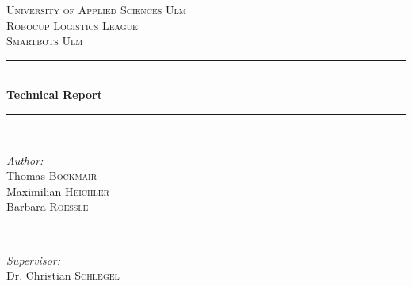 \documentclass[12pt]{report}
\begin{document}
\begin{titlepage}

\newcommand{\HRule}{\rule{\linewidth}{0.5mm}} %

\center %
 

\textsc{\LARGE University of Applied Sciences Ulm}\\[1.5cm] %
\textsc{\Large Robocup Logistics League}\\[0.5cm] %
\textsc{\large Smartbots Ulm}\\[0.5cm] %


\HRule \\[0.4cm]
{ \huge \bfseries Technical Report}\\[0.4cm] %
\HRule \\[1.5cm]
 

\begin{minipage}{0.4\textwidth}
\begin{flushleft} \large
\emph{Author:}\\
Thomas \textsc{Bockmair} \\%
Maximilian \textsc{Heichler} \\%
Barbara \textsc{Roessle} \\%
\end{flushleft}
\end{minipage}
~
\begin{minipage}{0.4\textwidth}
\begin{flushright} \large
\emph{Supervisor:} \\
Dr. Christian \textsc{Schlegel} %
\end{flushright}
\end{minipage}\\[2cm]


\end{titlepage}
\end{document}
